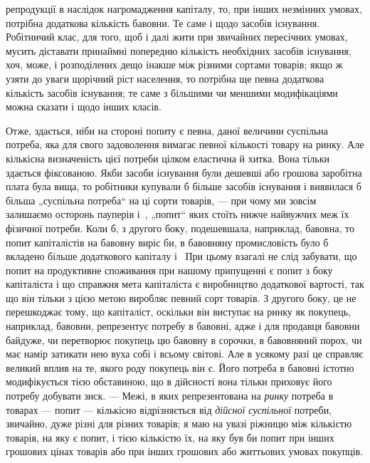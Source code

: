 \enlargethispage{\baselineskip}

\parcont{}  %
репродукції в наслідок нагромадження капіталу, то, при інших
незмінних умовах, потрібна додаткова кількість бавовни. Те саме
і щодо засобів існування. Робітничий клас, для того, щоб і далі
жити при звичайних пересічних умовах, мусить діставати принаймні
попередню кількість необхідних засобів існування, хоч,
може, і розподілених дещо інакше між різними сортами товарів;
якщо ж узяти до уваги щорічний ріст населення, то потрібна
ще певна додаткова кількість засобів існування; те саме
з більшими чи меншими модифікаціями можна сказати і щодо
інших класів.

Отже, здається, ніби на стороні попиту є певна, даної величини
суспільна потреба, яка для свого задоволення вимагає
певної кількості товару на ринку. Але кількісна визначеність
цієї потреби цілком еластична й хитка. Вона тільки здається
фіксованою. Якби засоби існування були дешевші або грошова
заробітна плата була вища, то робітники купували б більше
засобів існування і виявилася б більша „суспільна потреба“ на
ці сорти товарів, — при чому ми зовсім залишаємо осторонь
пауперів і~, „попит“ яких стоїть нижче найвужчих меж їх
фізичної потреби. Коли б, з другого боку, подешевшала, наприклад,
бавовна, то попит капіталістів на бавовну виріс би, в бавовняну
промисловість було б вкладено більше додаткового
капіталу і~ При цьому взагалі не слід забувати, що попит
на продуктивне споживання при нашому припущенні є попит
з боку капіталіста і що справжня мета капіталіста є виробництво
додаткової вартості, так що він тільки з цією метою
виробляє певний сорт товарів. З другого боку, це не перешкоджає
тому, що капіталіст, оскільки він виступає на ринку як
покупець, наприклад, бавовни, репрезентує потребу в бавовні,
адже і для продавця бавовни байдуже, чи перетворює покупець
цю бавовну в сорочки, в бавовняний порох, чи має намір
затикати нею вуха собі і всьому світові. Але в усякому разі це
справляє великий вплив на те, якого роду покупець він є. Його
потреба в бавовні істотно модифікується тією обставиною, що
в дійсності вона тільки приховує його потребу добувати зиск. —
Межі, в яких репрезентована на \emph{ринку} потреба в товарах —
попит — кількісно відрізняється від \emph{дійсної суспільної} потреби,
звичайно, дуже різні для різних товарів; я маю на увазі ріжницю
між кількістю товарів, на яку є попит, і тією кількістю
їх, на яку був би попит при інших грошових цінах товарів або
при інших грошових або життьових умовах покупців.

